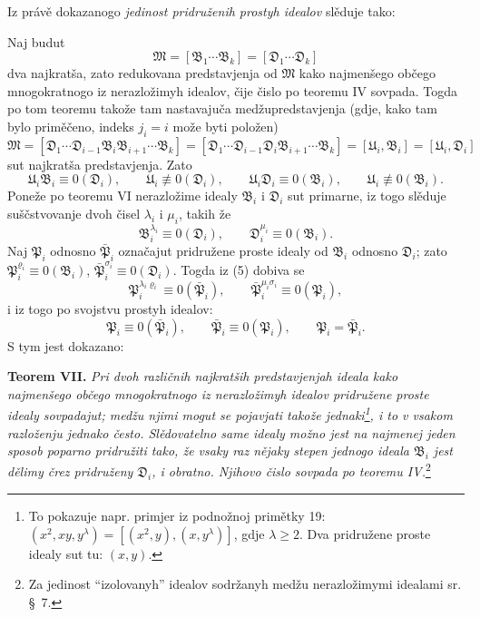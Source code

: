 \documentclass[11pt]{article}
\newcommand{\ideal}[1]{\mathfrak{#1}}
\begin{document}
Iz právě dokazanogo \emph{jedinost pridruženih prostyh idealov} slěduje tako:

Naj budut
\[
 \ideal M=[\ideal B_1\cdots\ideal B_k]=[\ideal D_1\cdots\ideal D_k]
\]
dva najkratša, zato redukovana predstavjenja od \(\ideal M\) kako najmenšego občego mnogokratnogo iz nerazložimyh idealov, čije čislo po teoremu IV sovpada. Togda po tom teoremu takože tam nastavajuča medžupredstavjenja (gdje, kako tam bylo priměčeno, indeks \(j_i=i\) može byti položen)
\[
 \ideal M=[\ideal D_1\cdots\ideal D_{i-1}\ideal B_i\ideal B_{i+1}\cdots\ideal B_k]
       =[\ideal D_1\cdots\ideal D_{i-1}\ideal D_i\ideal B_{i+1}\cdots\ideal B_k]
       =[\ideal U_i,\ideal B_i]=[\ideal U_i,\ideal D_i]
\]
sut najkratša predstavjenja. Zato
\[
 \ideal U_i\ideal B_i\equiv0(\ideal D_i),\qquad \ideal U_i\not\equiv0(\ideal D_i),
 \qquad
 \ideal U_i\ideal D_i\equiv0(\ideal B_i),\qquad \ideal U_i\not\equiv0(\ideal B_i).
\]
Poneže po teoremu VI nerazložime idealy \(\ideal B_i\) i \(\ideal D_i\) sut primarne, iz togo slěduje suščstvovanje dvoh čisel \(\lambda_i\) i \(\mu_i\), takih že
\begin{equation}
 \ideal B_i^{\lambda_i}\equiv0(\ideal D_i),
 \qquad
 \ideal D_i^{\mu_i}\equiv0(\ideal B_i).
\tag{5}
\end{equation}
Naj \(\ideal P_i\) odnosno \(\bar{\ideal P}_i\) označajut pridružene proste idealy od \(\ideal B_i\) odnosno \(\ideal D_i\); zato \(\ideal P_i^{\varrho_i}\equiv0(\ideal B_i)\), \(\bar{\ideal P}_i^{\sigma_i}\equiv0(\ideal D_i)\). Togda iz (5) dobiva se
\[
 \ideal P_i^{\lambda_i\varrho_i}\equiv0(\bar{\ideal P}_i),
 \qquad
 \bar{\ideal P}_i^{\mu_i\sigma_i}\equiv0(\ideal P_i),
\]
i iz togo po svojstvu prostyh idealov:
\[
 \ideal P_i\equiv0(\bar{\ideal P}_i),
 \qquad
 \bar{\ideal P}_i\equiv0(\ideal P_i),
 \qquad
 \ideal P_i=\bar{\ideal P}_i.
\]
S tym jest dokazano:

\textbf{Teorem VII.} \emph{Pri dvoh različnih najkratših predstavjenjah ideala kako najmenšego občego mnogokratnogo iz nerazložimyh idealov pridružene proste idealy sovpadajut; medžu njimi mogut se pojavjati takože jednaki\footnote{To pokazuje napr. primjer iz podnožnoj primětky 19: \((x^2,xy,y^\lambda)=[(x^2,y),(x,y^\lambda)]\), gdje \(\lambda\ge2\). Dva pridružene proste idealy sut tu: \((x,y)\).}, i to v vsakom razloženju jednako često. Slědovatelno same idealy možno jest na najmenej jeden sposob poparno pridružiti tako, že vsaky raz nějaky stepen jednogo ideala \(\ideal B_i\) jest dělimy črez pridruženy \(\ideal D_i\), i obratno. Njihovo čislo sovpada po teoremu IV.}\footnote{Za jedinost ``izolovanyh'' idealov sodržanyh medžu nerazložimymi idealami sr. \S~7.}
\end{document}
